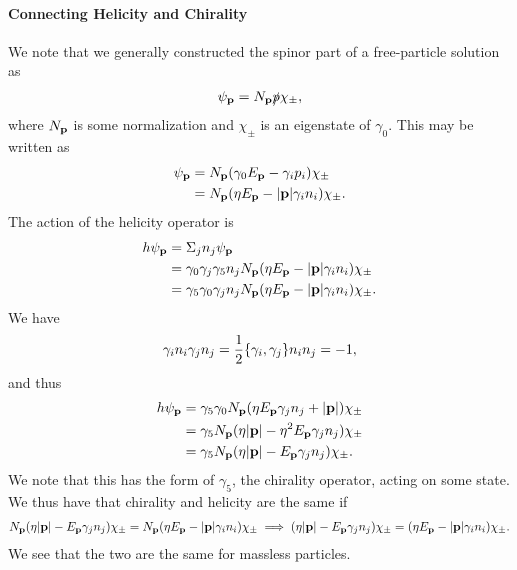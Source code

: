 \paragraph{Connecting Helicity and Chirality}
We note that we generally constructed the spinor part of a free-particle solution as
\begin{align*}
	\psi_{\vb{p}} = N_{\vb{p}}\slashed{p}\chi_{\pm},
\end{align*}
where $N_{\vb{p}}$ is some normalization and $\chi_{\pm}$ is an eigenstate of $\gamma_{0}$. This may be written as
\begin{align*}
	\psi_{\vb{p}} &= N_{\vb{p}}(\gamma_{0}E_{\vb{p}} - \gamma_{i}p_{i})\chi_{\pm} \\
	              &= N_{\vb{p}}(\eta E_{\vb{p}} - \abs{\vb{p}}\gamma_{i}n_{i})\chi_{\pm}.
\end{align*}
The action of the helicity operator is
\begin{align*}
	h\psi_{\vb{p}} &= \Sigma_{j}n_{j}\psi_{\vb{p}} \\ 
	               &= \gamma_{0}\gamma_{j}\gamma_{5}n_{j}N_{\vb{p}}(\eta E_{\vb{p}} - \abs{\vb{p}}\gamma_{i}n_{i})\chi_{\pm} \\
	               &= \gamma_{5}\gamma_{0}\gamma_{j}n_{j}N_{\vb{p}}(\eta E_{\vb{p}} - \abs{\vb{p}}\gamma_{i}n_{i})\chi_{\pm}.
\end{align*}
We have
\begin{align*}
	\gamma_{i}n_{i}\gamma_{j}n_{j} = \frac{1}{2}\acomm{\gamma_{i}}{\gamma_{j}}n_{i}n_{j} = -1,
\end{align*}
and thus
\begin{align*}
	h\psi_{\vb{p}} &= \gamma_{5}\gamma_{0}N_{\vb{p}}(\eta E_{\vb{p}}\gamma_{j}n_{j} + \abs{\vb{p}})\chi_{\pm} \\
	               &= \gamma_{5}N_{\vb{p}}(\eta\abs{\vb{p}} - \eta^{2}E_{\vb{p}}\gamma_{j}n_{j})\chi_{\pm} \\
	               &= \gamma_{5}N_{\vb{p}}(\eta\abs{\vb{p}} - E_{\vb{p}}\gamma_{j}n_{j})\chi_{\pm}.
\end{align*}
We note that this has the form of $\gamma_{5}$, the chirality operator, acting on some state. We thus have that chirality and helicity are the same if
\begin{align*}
	N_{\vb{p}}(\eta\abs{\vb{p}} - E_{\vb{p}}\gamma_{j}n_{j})\chi_{\pm} = N_{\vb{p}}(\eta E_{\vb{p}} - \abs{\vb{p}}\gamma_{i}n_{i})\chi_{\pm} \implies (\eta\abs{\vb{p}} - E_{\vb{p}}\gamma_{j}n_{j})\chi_{\pm} = (\eta E_{\vb{p}} - \abs{\vb{p}}\gamma_{i}n_{i})\chi_{\pm}.
\end{align*}
We see that the two are the same for massless particles.

